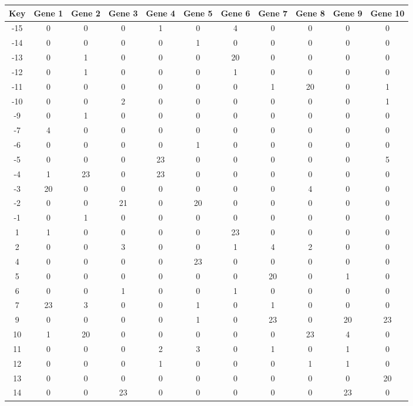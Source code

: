 \begin{tabular}{|c|c|c|c|c|c|c|c|c|c|c|}
\hline
Key & Gene 1 & Gene 2 & Gene 3 & Gene 4 & Gene 5 & Gene 6 & Gene 7 & Gene 8 & Gene 9 & Gene 10 \\
\hline
-15 & 0 & 0 & 0 & 1 & 0 & 4 & 0 & 0 & 0 & 0 \\
-14 & 0 & 0 & 0 & 0 & 1 & 0 & 0 & 0 & 0 & 0 \\
-13 & 0 & 1 & 0 & 0 & 0 & 20 & 0 & 0 & 0 & 0 \\
-12 & 0 & 1 & 0 & 0 & 0 & 1 & 0 & 0 & 0 & 0 \\
-11 & 0 & 0 & 0 & 0 & 0 & 0 & 1 & 20 & 0 & 1 \\
-10 & 0 & 0 & 2 & 0 & 0 & 0 & 0 & 0 & 0 & 1 \\
-9 & 0 & 1 & 0 & 0 & 0 & 0 & 0 & 0 & 0 & 0 \\
-7 & 4 & 0 & 0 & 0 & 0 & 0 & 0 & 0 & 0 & 0 \\
-6 & 0 & 0 & 0 & 0 & 1 & 0 & 0 & 0 & 0 & 0 \\
-5 & 0 & 0 & 0 & 23 & 0 & 0 & 0 & 0 & 0 & 5 \\
-4 & 1 & 23 & 0 & 23 & 0 & 0 & 0 & 0 & 0 & 0 \\
-3 & 20 & 0 & 0 & 0 & 0 & 0 & 0 & 4 & 0 & 0 \\
-2 & 0 & 0 & 21 & 0 & 20 & 0 & 0 & 0 & 0 & 0 \\
-1 & 0 & 1 & 0 & 0 & 0 & 0 & 0 & 0 & 0 & 0 \\
1 & 1 & 0 & 0 & 0 & 0 & 23 & 0 & 0 & 0 & 0 \\
2 & 0 & 0 & 3 & 0 & 0 & 1 & 4 & 2 & 0 & 0 \\
4 & 0 & 0 & 0 & 0 & 23 & 0 & 0 & 0 & 0 & 0 \\
5 & 0 & 0 & 0 & 0 & 0 & 0 & 20 & 0 & 1 & 0 \\
6 & 0 & 0 & 1 & 0 & 0 & 1 & 0 & 0 & 0 & 0 \\
7 & 23 & 3 & 0 & 0 & 1 & 0 & 1 & 0 & 0 & 0 \\
9 & 0 & 0 & 0 & 0 & 1 & 0 & 23 & 0 & 20 & 23 \\
10 & 1 & 20 & 0 & 0 & 0 & 0 & 0 & 23 & 4 & 0 \\
11 & 0 & 0 & 0 & 2 & 3 & 0 & 1 & 0 & 1 & 0 \\
12 & 0 & 0 & 0 & 1 & 0 & 0 & 0 & 1 & 1 & 0 \\
13 & 0 & 0 & 0 & 0 & 0 & 0 & 0 & 0 & 0 & 20 \\
14 & 0 & 0 & 23 & 0 & 0 & 0 & 0 & 0 & 23 & 0 \\
\hline
\end{tabular}
